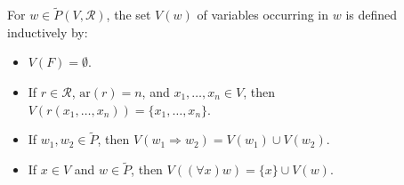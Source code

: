 For $w \in \tilde{P}(V, \mathcal{R})$, the set $V(w)$ of variables occurring in $w$ is defined inductively by:
\begin{itemize}
\item[(i)] $V(F) = \emptyset$.
\item[(ii)] If $r \in \mathcal{R}$, $\text{ar}(r) = n$, and $x_1, \ldots, x_n \in V$, then $V(r(x_1, \ldots, x_n)) = \{x_1, \ldots, x_n\}$.
\item[(iii)] If $w_1, w_2 \in \tilde{P}$, then $V(w_1 \Rightarrow w_2) = V(w_1) \cup V(w_2)$.
\item[(iv)] If $x \in V$ and $w \in \tilde{P}$, then $V((\forall x)w) = \{x\} \cup V(w)$.
\end{itemize}
